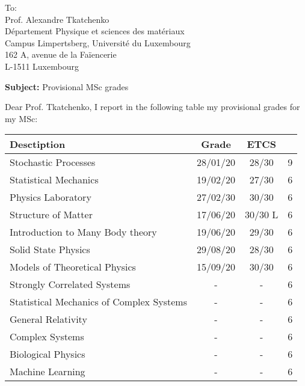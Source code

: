 \documentclass[boldsubject,italicsignature,smartindent]{letteracdp} %
\date{14 luglio 2017}
\begin{document}

\begin{letter}{To:\\Prof. Alexandre Tkatchenko\\Département Physique et sciences des matériaux\\Campus Limpertsberg, Université du Luxembourg\\
162 A, avenue de la Faïencerie\\ 
L-1511 Luxembourg} %


\opening{\textbf{Subject:} Provisional MSc grades}
Dear Prof. Tkatchenko,
I report in the following table my provisional grades for my MSc:

\begin{table}
\centering
    \begin{tabular}{lccc}
    \toprule
        \textbf{Desctiption}  &  \textbf{Grade} & \textbf{ETCS} \\
    \midrule
        Stochastic Processes	&	28/01/20	&	28/30	&	9	\\
Statistical Mechanics	&	19/02/20	&	27/30	&	6	\\
Physics Laboratory	&	27/02/30	&	30/30	&	6	\\
Structure of Matter	&	17/06/20	&	30/30 L	&	6	\\
Introduction to Many Body theory	&	19/06/20	&	29/30	&	6	\\
Solid State Physics	&	29/08/20	&	28/30	&	6	\\
Models of Theoretical Physics	&	15/09/20	&	30/30	&	6	\\
Strongly Correlated Systems	&	-	&	-	&	6	\\
Statistical Mechanics of Complex Systems	&	-	&	-	&	6	\\
General Relativity	&	-	&	-	&	6	\\
Complex Systems	&	-	&	-	&	6	\\
Biological Physics	&	-	&	-	&	6	\\
Machine Learning	&	-	&	-	&	6	\\
    \bottomrule
    \end{tabular}
\end{table}







\end{letter}
 
\end{document}
